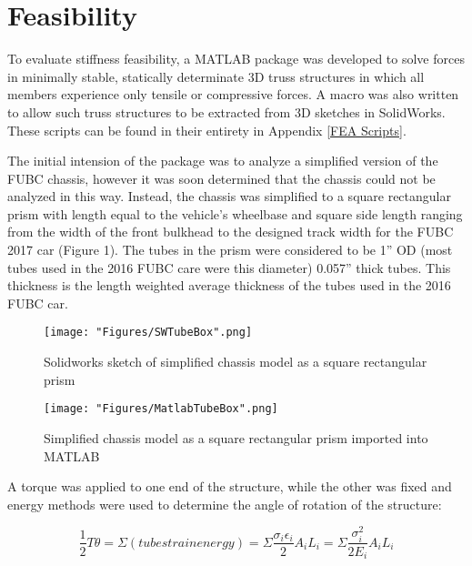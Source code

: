 \documentclass[a4paper]{article}
\numberwithin{equation}{section}
\begin{document}
\section{Feasibility} \label{Feasibility}
To evaluate stiffness feasibility, a MATLAB package was developed to solve forces in minimally stable, statically determinate 3D truss structures in which all members experience only tensile or compressive forces. A macro was also written to allow such truss structures to be extracted from 3D sketches in SolidWorks. These scripts can be found in their entirety in Appendix \ref{FEA Scripts}.

The initial intension of the package was to analyze a simplified version of the FUBC chassis, however it was soon determined that the chassis could not be analyzed in this way. Instead, the chassis was simplified to a square rectangular prism with length equal to the vehicle’s wheelbase and square side length ranging from the width of the front bulkhead to the designed track width for the FUBC 2017 car (Figure 1). The tubes in the prism were considered to be 1” OD (most tubes used in the 2016 FUBC care were this diameter) 0.057” thick tubes. This thickness is the length weighted average thickness of the tubes used in the 2016 FUBC car. 

\begin{figure}[h]
	\begin{center}
		\texttt{[image: "Figures/SWTubeBox".png]}
	\end{center}
	
	\caption{Solidworks sketch of simplified chassis model as a square rectangular prism}
	\label{fig:SWTubeBox}
\end{figure}

\begin{figure}[h]
	\begin{center}
		\texttt{[image: "Figures/MatlabTubeBox".png]}
	\end{center}
	
	\caption{Simplified chassis model as a square rectangular prism imported into MATLAB}
	\label{fig:MatlabTubeBox}
\end{figure}

A torque was applied to one end of the structure, while the other was fixed and energy methods were used to determine the angle of rotation of the structure:

\begin{equation}
\frac{1}{2}T\theta = \Sigma(tube strain energy)=\Sigma\frac{\sigma_i\epsilon_i}{2}A_i L_i = \Sigma\frac{\sigma_i^2}{2E_i}A_i L_i
\end{equation}
\end{document}
